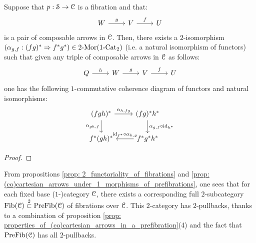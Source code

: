             \begin{proposition} \label{prop: 2_functoriality_of_fibrations}
                Suppose that $p: \mathcal{S} \to \mathcal{C}$ is a fibration and that:
                    $$
                        \begin{tikzcd}
                        	W & V & U
                        	\arrow["g", from=1-1, to=1-2]
                        	\arrow["f", from=1-2, to=1-3]
                        \end{tikzcd}
                    $$
                is a pair of composable arrows in $\mathcal{C}$. Then, there exists a $2$-isomorphism $(\alpha_{g, f}: (fg)^* \Rightarrow f^*g^*) \in 2\text{-}\mathrm{Mor}(1\text{-}\mathrm{Cat}_2)$ (i.e. a natural isomorphism of functors) such that given any triple of composable arrows in $\mathcal{C}$ as follows:
                    $$
                        \begin{tikzcd}
                        	Q & W & V & U
                        	\arrow["g", from=1-2, to=1-3]
                        	\arrow["f", from=1-3, to=1-4]
                        	\arrow["h", from=1-1, to=1-2]
                        \end{tikzcd}
                    $$
                one has the following $1$-commutative coherence diagram of functors and natural isomorphisms:
                    $$
                        \begin{tikzcd}
                        	{(fgh)^*} & {(fg)^*h^*} \\
                        	{f^*(gh)^*} & {f^*g^*h^*}
                        	\arrow["{\alpha_{gh, f}}"', from=1-1, to=2-1]
                        	\arrow["{\id_{f^*} \circ \alpha_{h, g}}"', from=2-2, to=2-1]
                        	\arrow["{\alpha_{g, f} \circ \id_{h^*}}", from=1-2, to=2-2]
                        	\arrow["{\alpha_{h, fg}}", from=1-1, to=1-2]
                        \end{tikzcd}
                    $$
            \end{proposition}
                \begin{proof}
                            
                \end{proof}
            \begin{corollary} \label{coro: 2_categories_of_fibrations}
                From propositions \ref{prop: 2_functoriality_of_fibrations} and \ref{prop: (co)cartesian_arrows_under_1_morphisms_of_prefibrations}, one sees that for each fixed base ($1$-)category $\mathcal{C}$, there exists a corresponding full $2$-subcategory $\mathrm{Fib}(\mathcal{C}) \overset{2}{\subset} \mathrm{Pre}\mathrm{Fib}(\mathcal{C})$ of fibrations over $\mathcal{C}$. This $2$-category has $2$-pullbacks, thanks to a combination of proposition \ref{prop: properties_of_(co)cartesian_arrows_in_a_prefibration}(4) and the fact that $\mathrm{Pre}\mathrm{Fib}(\mathcal{C})$ has all $2$-pullbacks.
            \end{corollary}
            
